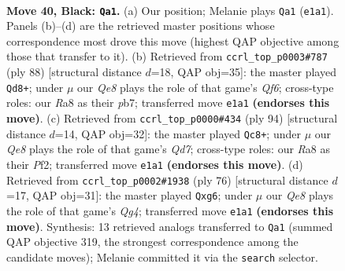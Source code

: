 \documentclass[11pt]{article}
\begin{document}
\clearpage

\begin{figure}[p]\centering
\begin{subfigure}{0.46\textwidth}\centering
\resizebox{\linewidth}{!}{%
\newchessgame
\chessboard[
  setfen={r7/8/4kp2/3p4/5P2/p2Q2P1/P5KP/4q3 b - - 0 40},
  showmover=false,
  pgfstyle=straightmove, color=movearrow, markmove={e1-a1}
]}
\caption{}
\end{subfigure}\hfill
\begin{subfigure}{0.46\textwidth}\centering
\resizebox{\linewidth}{!}{%
\newchessgame
\chessboard[
  setfen={1k6/1pp5/p2p1Q2/P4P2/4q3/1P6/1KP5/8 w - - 1 45},
  showmover=false,
  pgfstyle=straightmove, color=movearrow, markmove={f6-d8}
]}
\caption{}
\end{subfigure}
\\[4pt]
\begin{subfigure}{0.46\textwidth}\centering
\resizebox{\linewidth}{!}{%
\newchessgame
\chessboard[
  setfen={6k1/3Q1pp1/1p6/p6P/1q1P4/1P6/5PK1/8 w - - 4 48},
  showmover=false,
  pgfstyle=straightmove, color=movearrow, markmove={d7-c8}
]}
\caption{}
\end{subfigure}\hfill
\begin{subfigure}{0.46\textwidth}\centering
\resizebox{\linewidth}{!}{%
\newchessgame
\chessboard[
  setfen={k7/1p6/p1p3p1/8/P4PQ1/1q2P3/4K3/8 w - - 0 39},
  showmover=false,
  pgfstyle=straightmove, color=movearrow, markmove={g4-g6}
]}
\caption{}
\end{subfigure}
\caption{\textbf{Move 40, Black: \texttt{Qa1}.} (a) Our position; Melanie plays \texttt{Qa1} (\texttt{e1a1}). Panels (b)--(d) are the retrieved master positions whose correspondence most drove this move (highest QAP objective among those that transfer to it). (b) Retrieved from \texttt{ccrl\_top\_p0003\#787} (ply 88) [structural distance $d$=18, QAP obj=35]: the master played \texttt{Qd8+}; under $\mu$ our \emph{Qe8} plays the role of that game's \emph{Qf6}; cross-type roles: our \emph{R}a8 as their \emph{p}b7; transferred move \texttt{e1a1} \textbf{(endorses this move)}. (c) Retrieved from \texttt{ccrl\_top\_p0000\#434} (ply 94) [structural distance $d$=14, QAP obj=32]: the master played \texttt{Qc8+}; under $\mu$ our \emph{Qe8} plays the role of that game's \emph{Qd7}; cross-type roles: our \emph{R}a8 as their \emph{P}f2; transferred move \texttt{e1a1} \textbf{(endorses this move)}. (d) Retrieved from \texttt{ccrl\_top\_p0002\#1938} (ply 76) [structural distance $d$=17, QAP obj=31]: the master played \texttt{Qxg6}; under $\mu$ our \emph{Qe8} plays the role of that game's \emph{Qg4}; transferred move \texttt{e1a1} \textbf{(endorses this move)}. Synthesis: 13 retrieved analogs transferred to \texttt{Qa1} (summed QAP objective 319, the strongest correspondence among the candidate moves); Melanie committed it via the \texttt{search} selector.}
\label{fig:thought-m79}
\end{figure}
\end{document}
